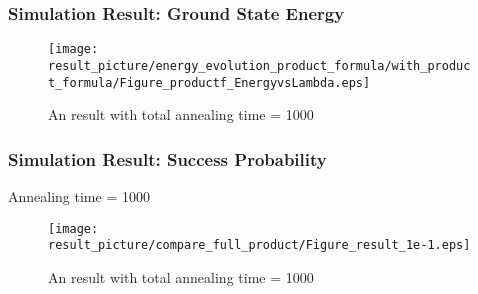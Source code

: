 \documentclass{beamer}
\begin{document}
%		
%
%
%
%		
%

\begin{frame}
	\frametitle{Simulation Result: Ground State Energy}
	\begin{figure}
		\centering
		\texttt{[image: result\_picture/energy\_evolution\_product\_formula/with\_product\_formula/Figure\_productf\_EnergyvsLambda.eps]}
		\caption{An result with total annealing time = 1000}
	\end{figure}
\end{frame}

\begin{frame}
	\frametitle{Simulation Result: Success Probability}
	Annealing time = 1000
	\begin{figure}
		\centering
		\texttt{[image: result\_picture/compare\_full\_product/Figure\_result\_1e-1.eps]}
		\caption{An result with total annealing time = 1000}
	\end{figure}
\end{frame}
\end{document}
